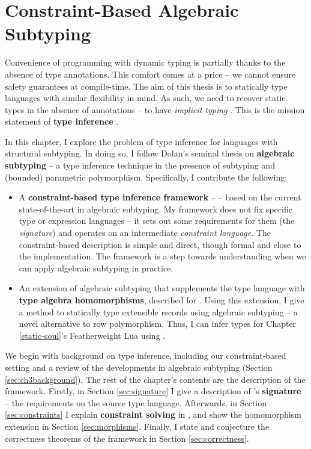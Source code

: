\newenvironment{example}{%
\begin{tcolorbox}[%
    colback=blue!5!white,%
    colframe=blue!60!black,%
    title=\textsc{Example}%
]%
}{%
\end{tcolorbox}%
}

\chapter{Constraint-Based Algebraic Subtyping}
\label{algebraic-subtyping}

Convenience of programming with dynamic typing is partially thanks to the absence of type annotations. 
This comfort comes at a price -- we cannot ensure safety guarantees at compile-time. 
The aim of this thesis is to statically type languages with similar flexibility in mind. As such, we need to recover static types in the absence of annotations -- to have \emph{implicit typing} \cite{remy-record-inference}. This is the mission statement of \textbf{type inference} \cite{tapl}.

In this chapter, I explore the problem of type inference for languages with structural subtyping. In doing so, I follow Dolan's seminal thesis on \textbf{algebraic subtyping} -- a type inference technique in the presence of subtyping and (bounded) parametric polymorphism. Specifically, I contribute the following:
\begin{itemize}
    \item A \textbf{constraint-based type inference framework} -- \inference{} -- based on the current state-of-the-art in algebraic subtyping. My framework does not fix specific type or expression languages -- it sets out some requirements for them (the \textit{signature}) and operates on an intermediate \emph{constraint language}. The constraint-based description is simple and direct, though formal and close to the implementation. The framework is a step towards understanding when we can apply algebraic subtyping in practice.
    \item An extension of algebraic subtyping that supplements the type language with \textbf{type algebra homomorphisms}, described for \inference{}. Using this extension, I give a method to statically type extensible records using algebraic subtyping -- a novel alternative to row polymorphism. Thus, I can infer types for Chapter \ref{static-soul}'s Featherweight Lua using \inference{}.
\end{itemize}

We begin with background on type inference, including our constraint-based setting and a review of the developments in algebraic subtyping (Section \ref{sec:ch3background}). The rest of the chapter's contents are the description of the framework. Firstly, in Section \ref{sec:signature} I give a description of \inference{}'s \textbf{signature} -- the requirements on the source type language. Afterwards, in Section \ref{sec:constraints} I explain \textbf{constraint solving} in \inference{}, and show the homomorphism extension in Section \ref{sec:morphisms}. Finally, I state and conjecture the correctness theorems of the framework in Section \ref{sec:correctness}. 

